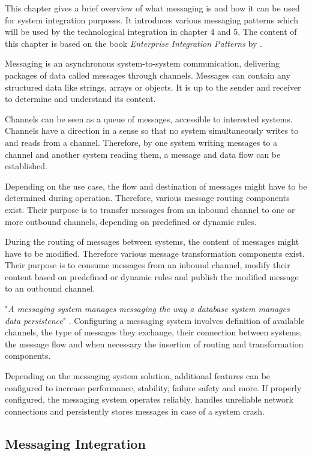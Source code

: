 This chapter gives a brief overview of what messaging is and how it can be used for system integration purposes. It introduces various messaging patterns which will be used by the technological integration in chapter 4 and 5.
The content of this chapter is based on the book \textit{Enterprise Integration Patterns} by \textcite{EIP}.

Messaging is an asynchronous system-to-system communication, delivering packages of data called messages through channels. Messages can contain any structured data like strings, arrays or objects. It is up to the sender and receiver to determine and understand its content.

Channels can be seen as a queue of messages, accessible to interested systems. Channels have a direction in a sense so that no system simultaneously writes to and reads from a channel. Therefore, by one system writing messages to a channel and another system reading them, a message and data flow can be established.

Depending on the use case, the flow and destination of messages might have to be determined during operation. Therefore, various message routing components exist. Their purpose is to transfer messages from an inbound channel to one or more outbound channels, depending on predefined or dynamic rules.

During the routing of messages between systems, the content of messages might have to be modified. Therefore various message transformation components exist. Their purpose is to consume messages from an inbound channel, modify their content based on predefined or dynamic rules and publish the modified message to an outbound channel.

"\textit{A messaging system manages messaging the way a database system manages data persistence}" \cite[p. 31]{EIP}. Configuring a messaging system involves definition of available channels, the type of messages they exchange, their connection between systems, the message flow and when necessary the insertion of routing and transformation components.

Depending on the messaging system solution, additional features can be configured to increase performance, stability, failure safety and more. If properly configured, the messaging system operates reliably, handles unreliable network connections and persistently stores messages in case of a system crash.

\subsection{Messaging Integration}

